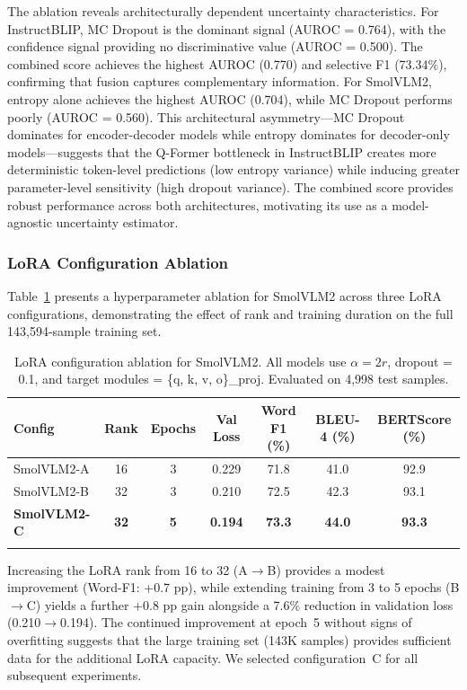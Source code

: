 \documentclass[pdflatex,sn-mathphys-num]{sn-jnl}
\begin{document}
The ablation reveals architecturally dependent uncertainty characteristics. For InstructBLIP, MC Dropout is the dominant signal (AUROC = 0.764), with the confidence signal providing no discriminative value (AUROC = 0.500). The combined score achieves the highest AUROC (0.770) and selective F1 (73.34\%), confirming that fusion captures complementary information. For SmolVLM2, entropy alone achieves the highest AUROC (0.704), while MC Dropout performs poorly (AUROC = 0.560). This architectural asymmetry---MC Dropout dominates for encoder-decoder models while entropy dominates for decoder-only models---suggests that the Q-Former bottleneck in InstructBLIP creates more deterministic token-level predictions (low entropy variance) while inducing greater parameter-level sensitivity (high dropout variance). The combined score provides robust performance across both architectures, motivating its use as a model-agnostic uncertainty estimator.

\subsubsection{LoRA Configuration Ablation}

Table~\ref{tab:lora_ablation} presents a hyperparameter ablation for SmolVLM2 across three LoRA configurations, demonstrating the effect of rank and training duration on the full 143,594-sample training set.

\begin{table}[t]
\caption{LoRA configuration ablation for SmolVLM2. All models use $\alpha = 2r$, dropout = 0.1, and target modules = \{q, k, v, o\}\_proj. Evaluated on 4,998 test samples.}\label{tab:lora_ablation}
\begin{tabular*}{\textwidth}{@{\extracolsep\fill}lcccccc}
\toprule
\textbf{Config} & \textbf{Rank} & \textbf{Epochs} & \textbf{Val Loss} & \textbf{Word F1 (\%)} & \textbf{BLEU-4 (\%)} & \textbf{BERTScore (\%)} \\
\midrule
SmolVLM2-A & 16 & 3 & 0.229 & 71.8 & 41.0 & 92.9 \\
SmolVLM2-B & 32 & 3 & 0.210 & 72.5 & 42.3 & 93.1 \\
\textbf{SmolVLM2-C} & \textbf{32} & \textbf{5} & \textbf{0.194} & \textbf{73.3} & \textbf{44.0} & \textbf{93.3} \\
\botrule
\end{tabular*}
\end{table}

Increasing the LoRA rank from 16 to 32 (A$\to$B) provides a modest improvement (Word-F1: +0.7 pp), while extending training from 3 to 5 epochs (B$\to$C) yields a further +0.8 pp gain alongside a 7.6\% reduction in validation loss (0.210$\to$0.194). The continued improvement at epoch~5 without signs of overfitting suggests that the large training set (143K samples) provides sufficient data for the additional LoRA capacity. We selected configuration~C for all subsequent experiments.
\end{document}
